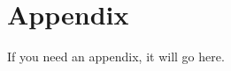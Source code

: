 \documentclass[letterpaper,11pt]{yalephd}
\begin{document}
\mainmatter









\appendix

\chapter{Appendix}
If you need an appendix, it will go here.




\backmatter


\end{document}
